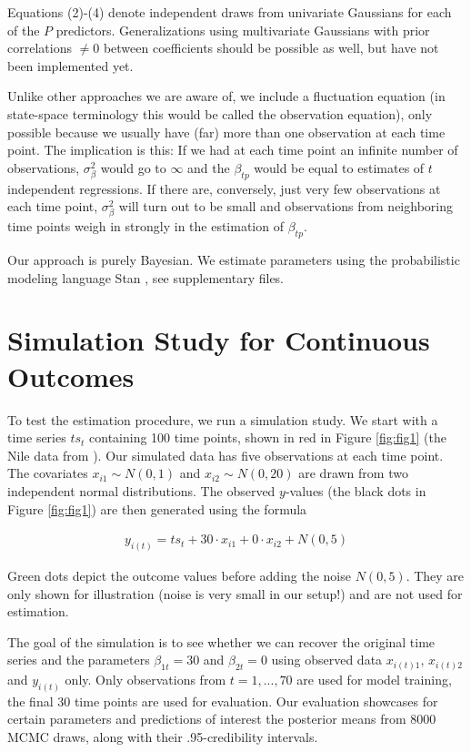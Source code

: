 \documentclass{article}
\begin{document}
Equations (2)-(4) denote independent draws from univariate Gaussians for each of the $P$ predictors. Generalizations using multivariate Gaussians with prior correlations $\neq 0$ between coefficients should be possible as well, but have not been implemented yet.

Unlike other approaches we are aware of, we include a fluctuation equation (in state-space terminology this would be called the observation equation), only possible because we usually have (far) more than one observation at each time point. The implication is this: If we had at each time point an infinite number of observations, $\sigma^2_\beta$ would go to $\infty$ and the $\beta_{tp}$ would be equal to estimates of $t$ independent regressions. If there are, conversely, just very few observations at each time point, $\sigma^2_\beta$ will turn out to be small and observations from neighboring time points weigh in strongly in the estimation of $\beta_{tp}$.

Our approach is purely Bayesian. We estimate parameters using the probabilistic modeling language Stan \citep{stan_development_team_rstan_2021}, see supplementary files.

\section{Simulation Study for Continuous Outcomes}

To test the estimation procedure, we run a simulation study. We start with a time series $ts_t$ containing 100 time points, shown in red in Figure \ref{fig:fig1} (the Nile data from \citep{durbin_time_2012}). Our simulated data has five observations at each time point. The covariates $x_{i1} \sim N(0,1)$ and $x_{i2} \sim N(0, 20)$ are drawn from two independent normal distributions. The observed $y$-values (the black dots in Figure \ref{fig:fig1}) are then generated using the formula

\begin{align}
y_{i(t)} = ts_t + 30 \cdot x_{i1} + 0 \cdot x_{i2} + N(0, 5)    
\end{align}

Green dots depict the outcome values before adding the noise $N(0, 5)$. They are only shown for illustration (noise is very small in our setup!) and are not used for estimation.

The goal of the simulation is to see whether we can recover the original time series and the parameters $\beta_{1t} = 30$ and $\beta_{2t} = 0$ using observed data $x_{i(t)1}$, $x_{i(t)2}$ and $y_{i(t)}$ only. Only observations from $t = 1, ..., 70$ are used for model training, the final 30 time points are used for evaluation. Our evaluation showcases for certain parameters and predictions of interest the posterior means from 8000 MCMC draws, along with their .95-credibility intervals.
\end{document}
